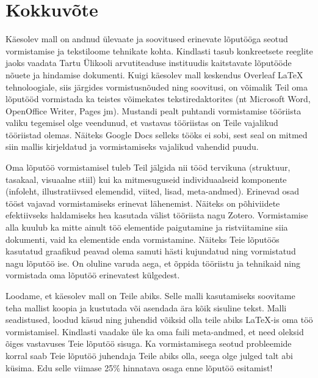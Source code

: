 \section{Kokkuvõte} \label{kokkuvõte}
Käesolev mall on andnud ülevaate ja soovitused erinevate lõputööga seotud vormistamise ja tekstiloome tehnikate kohta. Kindlasti tasub konkreetsete reeglite jaoks vaadata Tartu Ülikooli arvutiteaduse instituudis kaitstavate lõputööde nõuete ja hindamise dokumenti. Kuigi käesolev mall keskendus Overleaf LaTeX tehnoloogiale, siis järgides vormistusnõuded ning soovitusi, on võimalik Teil oma lõputööd vormistada ka teistes võimekates tekstiredaktorites (nt Microsoft Word, OpenOffice Writer, Pages jm). Mustandi pealt puhtandi vormistamise tööriista valiku tegemisel olge veendunud, et vastavas tööriistas on Teile vajalikud tööriistad olemas. Näiteks Google Docs selleks tööks ei sobi, sest seal on mitmed siin mallis kirjeldatud ja vormistamiseks vajalikud vahendid puudu.

Oma lõputöö vormistamisel tuleb Teil jälgida nii tööd tervikuna (struktuur, tasakaal, visuaalne stiil) kui ka mitmesuguseid individuaalseid komponente (infoleht, illustratiivsed elemendid, viited, lisad, meta-andmed). Erinevad osad tööst vajavad vormistamiseks erinevat lähenemist. Näiteks on põhiviidete efektiivseks haldamiseks hea kasutada välist tööriista nagu Zotero. Vormistamise alla kuulub ka mitte ainult töö elementide paigutamine ja ristviitamine siia dokumenti, vaid ka elementide enda vormistamine. Näiteks Teie lõputöös kasutatud graafikud peavad olema samuti hästi kujundatud ning vormistatud nagu lõputöö ise. On oluline varuda aega, et õppida tööriistu ja tehnikaid ning vormistada oma lõputöö erinevatest külgedest.

Loodame, et käesolev mall on Teile abiks. Selle malli kasutamiseks soovitame teha mallist koopia ja kustutada või asendada ära kõik sisuline tekst. Malli seadistused, loodud käsud ning juhendid võiksid olla teile abiks LaTeX-is oma töö vormistamisel. Kindlasti vaadake üle ka oma faili meta-andmed, et need oleksid õiges vastavuses Teie lõputöö sisuga. Ka vormistamisega seotud probleemide korral saab Teie lõputöö juhendaja Teile abiks olla, seega olge julged talt abi küsima. Edu selle viimase 25\% hinnatava osaga enne lõputöö esitamist!
